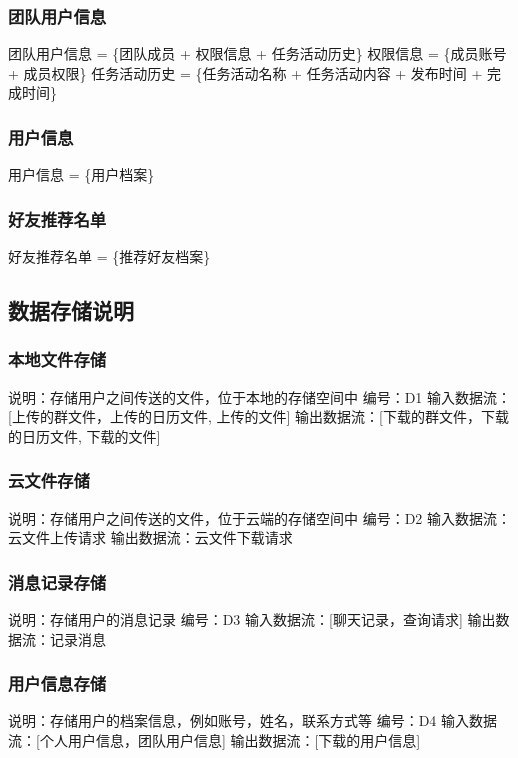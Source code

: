             \subsubsection{团队用户信息}
                团队用户信息 = \{团队成员 + 权限信息 + 任务活动历史\}
                权限信息 = \{成员账号 + 成员权限\}
                任务活动历史 = \{任务活动名称 + 任务活动内容 + 发布时间 + 完成时间\}
            \subsubsection{用户信息}
                用户信息 = \{用户档案\}
            \subsubsection{好友推荐名单}
                好友推荐名单 = \{推荐好友档案\}
            

        \subsection{数据存储说明}
            \subsubsection{本地文件存储}
                说明：存储用户之间传送的文件，位于本地的存储空间中
                编号：D1
                输入数据流：[上传的群文件，上传的日历文件, 上传的文件]
                输出数据流：[下载的群文件，下载的日历文件, 下载的文件]

            \subsubsection{云文件存储}
                说明：存储用户之间传送的文件，位于云端的存储空间中
                编号：D2
                输入数据流：云文件上传请求
                输出数据流：云文件下载请求
            \subsubsection{消息记录存储}
                说明：存储用户的消息记录
                编号：D3
                输入数据流：[聊天记录，查询请求]
                输出数据流：记录消息
            \subsubsection{用户信息存储}
                说明：存储用户的档案信息，例如账号，姓名，联系方式等
                编号：D4
                输入数据流：[个人用户信息，团队用户信息]
                输出数据流：[下载的用户信息]
